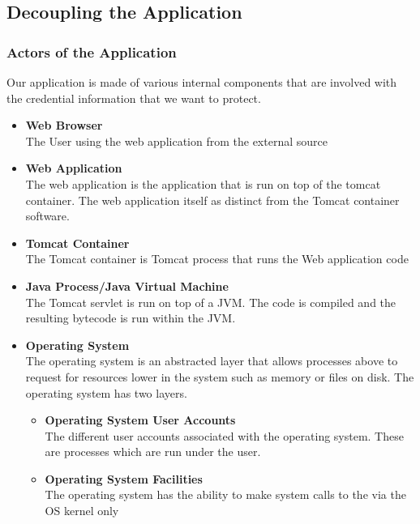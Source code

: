 \documentclass[11pt, a4paper, notitlepage]{article}
\begin{document}
\makeblankpage

\subsection*{Decoupling the Application}

\subsubsection*{Actors of the Application}
Our application is made of various internal components that are involved with the credential  information that we want to protect. 
\begin{itemize}
	\item \textbf {Web Browser} \\
	The User using the web application from the external source
	\item \textbf{Web Application} \\
	The web application is the application that is run on top of the tomcat container. The web application itself as distinct from the Tomcat container software.
	\item \textbf{Tomcat Container} \\
	The Tomcat container is Tomcat process that runs the Web application code
	\item \textbf{Java Process/Java Virtual Machine} \\
	The Tomcat servlet is run on top of a JVM. The code is compiled and the resulting bytecode is run within the JVM.
	\item \textbf {Operating System} \\
	The operating system is an abstracted layer that allows processes above to request for resources lower in the system such as memory or files on disk. The operating system has two layers.
	\begin{itemize}
		\item \textbf {Operating System User Accounts } \\
		The different user accounts associated with the operating system. These are processes which are run under the user. 
		\item \textbf {Operating System Facilities } \\
		The operating system has  the ability to make system calls to the via
		the OS kernel only
	\end{itemize}
\end{itemize}
\end{document}
